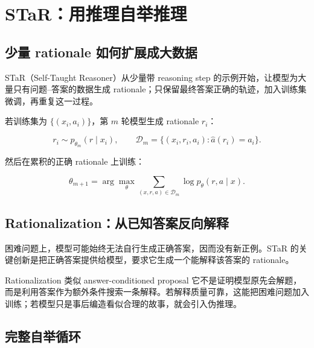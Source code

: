 \section{STaR：用推理自举推理}

\subsection{少量 rationale 如何扩展成大数据}

STaR（Self-Taught Reasoner）从少量带 reasoning step 的示例开始，让模型为大量只有问题--答案的数据生成 rationale；只保留最终答案正确的轨迹，加入训练集微调，再重复这一过程。


若训练集为 $\{(x_i,a_i)\}$，第 $m$ 轮模型生成 rationale $r_i$：

$$
r_i\sim p_{\theta_m}(r\mid x_i),\qquad
\mathcal D_m=\{(x_i,r_i,a_i):\hat a(r_i)=a_i\}.
$$

然后在累积的正确 rationale 上训练：

$$
\theta_{m+1}=\arg\max_\theta
\sum_{(x,r,a)\in\mathcal D_m}\log p_\theta(r,a\mid x).
$$

\subsection{Rationalization：从已知答案反向解释}

困难问题上，模型可能始终无法自行生成正确答案，因而没有新正例。STaR 的关键创新是把正确答案提供给模型，要求它生成一个能解释该答案的 rationale。


\begin{knowledgebox}{Rationalization 类似 answer-conditioned proposal}
它不是证明模型原先会解题，而是利用答案作为额外条件搜索一条解释。若解释质量可靠，这能把困难问题加入训练；若模型只是事后编造看似合理的故事，就会引入伪推理。
\end{knowledgebox}

\subsection{完整自举循环}


